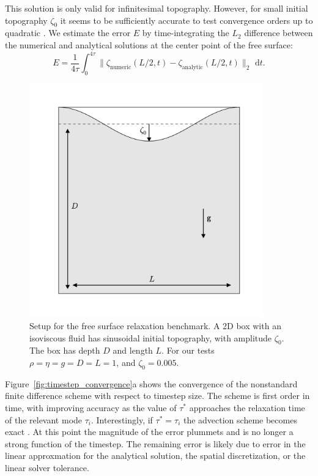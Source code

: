 \documentclass[preprint,12pt,authoryear]{elsarticle}
\begin{document}
This solution is only valid for infinitesimal topography. However, for small
initial topography $\zeta_0$ it seems to be sufficiently accurate to test convergence orders up 
to quadratic \citep{kramer2012implicit, furuichi2015implicit}.
We estimate the error $E$ by time-integrating the $L_2$ difference between the numerical and analytical
solutions at the center point of the free surface:
\begin{equation}
E = \frac{1}{4\tau}\int_0^{4 \tau} \lVert \zeta_\mathrm{numeric}(L/2, t) - \zeta_\mathrm{analytic}(L/2, t) \rVert_2 \text{ d}t.
\end{equation}

\begin{figure}
\includegraphics[width=0.9\textwidth]{figures/benchmark_setup.pdf}
\caption{Setup for the free surface relaxation benchmark. A 2D box with an isoviscous fluid has sinusoidal initial topography, with amplitude $\zeta_0$. The box has depth $D$ and length $L$. For our tests $\rho = \eta = g = D = L = 1$, and $\zeta_0 = 0.005$.}
\label{fig:benchmark_setup}
\end{figure}

Figure~\ref{fig:timestep_convergence}a shows the convergence of the nonstandard finite difference scheme 
with respect to timestep size. The scheme is first order in time, with improving accuracy as the value of $\tau^*$ approaches
the relaxation time of the relevant mode $\tau_i$. Interestingly, if $\tau^* = \tau_i$ the advection scheme
becomes exact \citep{mickens2002nonstandard}. At this point the magnitude of the error plummets and is no longer 
a strong function of the timestep. The remaining error is likely due to error in the linear approxmation for 
the analytical solution, the spatial discretization, or the linear solver tolerance. 
\end{document}
